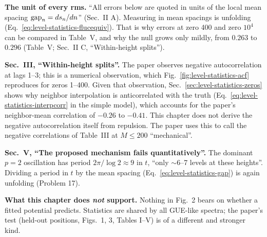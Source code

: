 \textbf{The unit of every rms.} ``All errors below are quoted in units of the local mean spacing $\mathrm{gap}_n=ds_n/dn$'' (Sec.~II A). Measuring in mean spacings is unfolding (Eq.~\eqref{eq:level-statistics-flucequiv}). That is why errors at zero 400 and zero $10^4$ can be compared in Table~V, and why the null grows only mildly, from $0.263$ to $0.296$ (Table~V; Sec.~II C, ``Within-height splits'').

\textbf{Sec.~III, ``Within-height splits''.} The paper observes negative autocorrelation at lags 1--3; this is a numerical observation, which Fig.~\ref{fig:level-statistics-acf} reproduces for zeros 1--400. Given that observation, Sec.~\ref{sec:level-statistics-zeros} shows why neighbor interpolation is anticorrelated with the truth (Eq.~\eqref{eq:level-statistics-interpcorr} in the simple model), which accounts for the paper's neighbor-mean correlation of $-0.26$ to $-0.41$. This chapter does not derive the negative autocorrelation itself from repulsion. The paper uses this to call the negative correlations of Table~III at $M\le200$ ``mechanical''.

\textbf{Sec.~V, ``The proposed mechanism fails quantitatively''.} The dominant $p=2$ oscillation has period $2\pi/\log2\approx9$ in $t$, ``only $\sim$6--7 levels at these heights''. Dividing a period in $t$ by the mean spacing (Eq.~\eqref{eq:level-statistics-gap}) is again unfolding (Problem 17).

\textbf{What this chapter does \emph{not} support.} Nothing in Fig.~2 bears on whether a fitted potential predicts. Statistics are shared by all GUE-like spectra; the paper's test (held-out positions, Figs.~1, 3, Tables I--V) is of a different and stronger kind.


